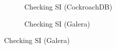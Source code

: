 \begin{figure}
 \begin{subfigure}{.33\textwidth}
  \caption{Checking SI (CockroachDB)}
  \label{roach_si_node_scale}
 \end{subfigure}
 \hspace{-2mm}
 \begin{subfigure}{.33\textwidth}
  \caption{Checking SI (Galera)}
  \label{galera_si_node_scale}
 \end{subfigure}
  \hspace{-2mm}

\end{figure}
